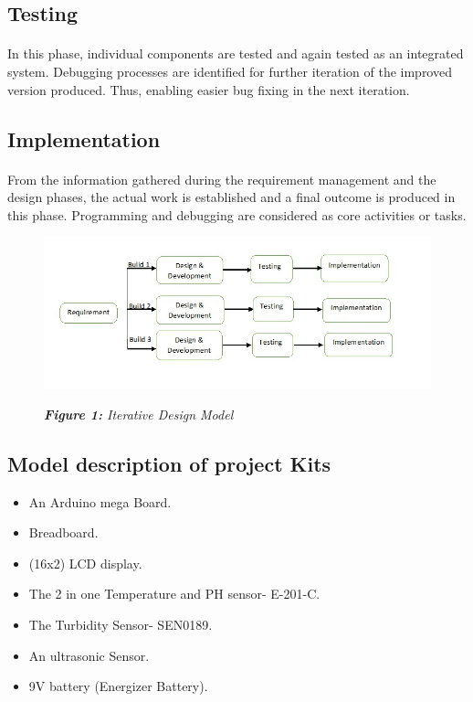 \documentclass[12pt]{article}
\begin{document}
\subsection*{Testing}
\paragraph*{}
In this phase, individual components are tested and again tested as an integrated system.  Debugging processes are identified for further iteration of the improved version produced. Thus, enabling easier bug fixing in the next iteration.
\subsection*{Implementation}
\paragraph*{}
From the information gathered during the requirement management and the design phases, the actual work is established and a final outcome is produced in this phase. Programming and debugging are considered as core activities or tasks.
\newpage
\begin{figure}
\includegraphics[scale=1,width=6in]{model.jpg}
\begin{center}
\textit{\textbf{Figure 1:} Iterative Design Model}
\end{center} 
\end{figure}

\subsection*{Model description of project Kits}
\begin{itemize}

\item	An Arduino mega Board.
\item	Breadboard.
\item	(16x2) LCD display.
\item	The 2 in one Temperature and PH sensor- E-201-C.
\item	The Turbidity Sensor- SEN0189.
\item	An ultrasonic Sensor.
\item	9V battery (Energizer Battery).

\end{itemize}
\end{document}
